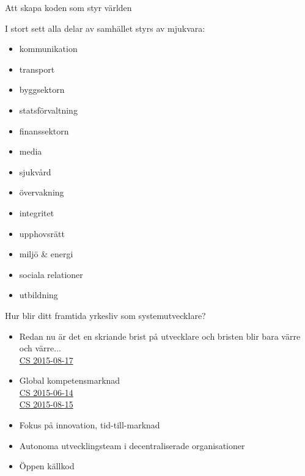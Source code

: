 \documentclass{lecturenotes}
\begin{document}
\begin{Slide}{Att skapa koden som styr världen}
\begin{multicols}{2}
I stort sett alla delar av samhället styrs av mjukvara:
{\scriptsize
\begin{itemize}
\item kommunikation
\item transport
\item byggsektorn
\item statsförvaltning
\item finanssektorn
\item media
\item sjukvård
\item övervakning
\item integritet
\item upphovsrätt
\item miljö \& energi
\item sociala relationer
\item utbildning 
\end{itemize}}
\columnbreak %
Hur blir ditt framtida yrkesliv som systemutvecklare?
{\Size{8pt}
\begin{itemize}
\item  Redan nu är det en skriande brist på utvecklare och bristen blir bara värre och värre... \\
  \href{http://computersweden.idg.se/2.2683/1.634770/rekrytera-utvecklare}{CS 2015-08-17}
\item Global kompetensmarknad \\ 
  \href{http://computersweden.idg.se/2.2683/1.630901/det-finns-programmerare-och-sa-finns-det-programmerare}{CS 2015-06-14}\\
   \href{http://computersweden.idg.se/2.2683/1.634700/7-satt-att-bli-en-battre-programmerare}{CS 2015-08-15}
\item Fokus på innovation, tid-till-marknad
\item Autonoma utvecklingsteam i decentraliserade organisationer
\item Öppen källkod
\end{itemize}}
\end{multicols}
\end{Slide}
\end{document}
